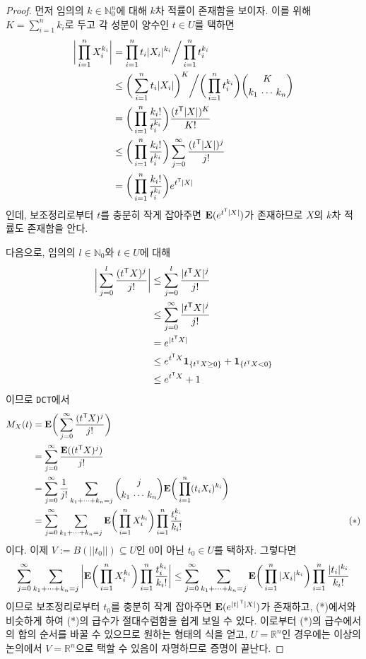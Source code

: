 \begin{proof}
    먼저 임의의 $k\in\mathbb{N}_0^n$에 대해 $k$차 적률이 존재함을 보이자. 이를 위해 $K=\sum_{i=1}^nk_i$로 두고 각 성분이 양수인 $t\in U$를 택하면
    \begin{align*}
        \bigg|\prod_{i=1}^nX_i^{k_i}\bigg|&=\prod_{i=1}^nt_i|X_i|^{k_i}\bigg/\prod_{i=1}^nt_i^{k_i}\\
        &\leq\bigg(\sum_{i=1}^nt_i|X_i|\bigg)^K\bigg/\bigg(\prod_{i=1}^nt_i^{k_i}\bigg)\binom{K}{k_1\,\cdots\,k_n}\\
        &=\bigg(\prod_{i=1}^n\frac{k_i!}{t_i^{k_i}}\bigg)\frac{(t^{\mathsf{T}}|X|)^K}{K!}\\
        &\leq\bigg(\prod_{i=1}^n\frac{k_i!}{t_i^{k_i}}\bigg)\sum_{j=0}^\infty\frac{(t^{\mathsf{T}}|X|)^j}{j!}\\
        &=\bigg(\prod_{i=1}^n\frac{k_i!}{t_i^{k_i}}\bigg)e^{t^{\mathsf{T}}|X|}
    \end{align*}
    인데, 보조정리로부터 $t$를 충분히 작게 잡아주면 $\mathbf{E}(e^{t^{\mathsf{T}}|X|})$가 존재하므로 $X$의 $k$차 적률도 존재함을 안다.

    다음으로, 임의의 $l\in\mathbb{N}_0$와 $t\in U$에 대해
    \begin{align*}
        \bigg|\sum_{j=0}^l\frac{(t^{\mathsf{T}} X)^j}{j!}\bigg|&\leq\sum_{j=0}^l\frac{|t^{\mathsf{T}} X|^j}{j!}\\
        &\leq\sum_{j=0}^\infty\frac{|t^{\mathsf{T}} X|^j}{j!}\\
        &=e^{|t^{\mathsf{T}} X|}\\
        &\leq e^{t^{\mathsf{T}} X}\mathbf{1}_{\{t^{\mathsf{T}} X\geq0\}}+\mathbf{1}_{\{t^{\mathsf{T}} X<0\}}\\
        &\leq e^{t^{\mathsf{T}} X}+1
    \end{align*}
    이므로 \texttt{DCT}에서
    \begin{align*}
        M_X(t)&=\mathbf{E}\bigg(\sum_{j=0}^\infty\frac{(t^{\mathsf{T}} X)^j}{j!}\bigg)\\
        &=\sum_{j=0}^\infty\frac{\mathbf{E}((t^{\mathsf{T}} X)^j)}{j!}\\
        &=\sum_{j=0}^\infty\frac{1}{j!}\sum_{k_1+\cdots+k_n=j}\binom{j}{k_1\,\cdots\,k_n}\mathbf{E}\bigg(\prod_{i=1}^n(t_iX_i)^{k_i}\bigg)\\
        &=\sum_{j=0}^\infty\sum_{k_1+\cdots+k_n=j}\mathbf{E}\bigg(\prod_{i=1}^nX_i^{k_i}\bigg)\prod_{i=1}^n\frac{t_i^{k_i}}{k_i!}&\qquad\qquad\qquad\qquad\qquad\qquad(*)
    \end{align*}
    이다. 이제 $V:=B(||t_0||)\subseteq U$인 $0$이 아닌 $t_0\in U$를 택하자. 그렇다면
    \begin{equation*}
        \sum_{j=0}^\infty\sum_{k_1+\cdots+k_n=j}\bigg|\mathbf{E}\bigg(\prod_{i=1}^nX_i^{k_i}\bigg)\prod_{i=1}^n\frac{t_i^{k_i}}{k_i!}\bigg|\leq\sum_{j=0}^\infty\sum_{k_1+\cdots+k_n=j}\mathbf{E}\bigg(\prod_{i=1}^n|X_i|^{k_i}\bigg)\prod_{i=1}^n\frac{|t_i|^{k_i}}{k_i!}
    \end{equation*}
    이므로 보조정리로부터 $t_0$를 충분히 작게 잡아주면 $\mathbf{E}(e^{|t|^{\,\mathsf{T}}|X|})$가 존재하고, (*)에서와 비슷하게 하여 (*)의 급수가 절대수렴함을 쉽게 보일 수 있다. 이로부터 (*)의 급수에서의 합의 순서를 바꿀 수 있으므로 원하는 형태의 식을 얻고, $U=\mathbb{R}^n$인 경우에는 이상의 논의에서 $V=\mathbb{R}^n$으로 택할 수 있음이 자명하므로 증명이 끝난다.
\end{proof}

